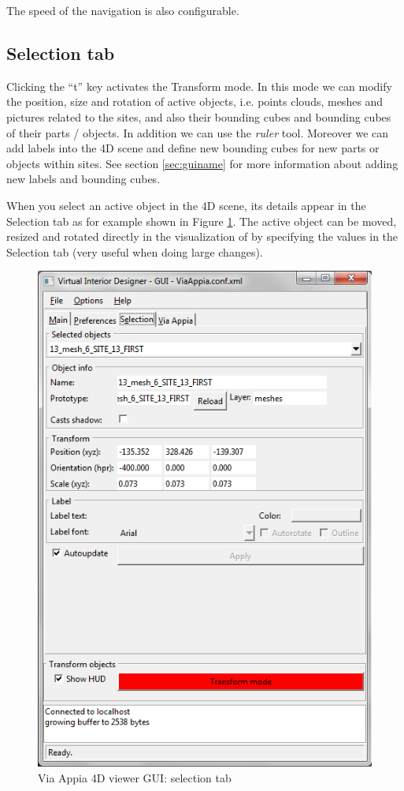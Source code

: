 \documentclass[a4paper,11pt]{article}
\begin{document}
The speed of the navigation is also configurable.

\subsection{Selection tab}

Clicking the ``t'' key activates the Transform mode. In this mode we can modify the position, size and rotation of active objects, i.e. points clouds, meshes and pictures related to the sites, and also their bounding cubes and bounding cubes of their parts / objects. In addition we can use the \textit{ruler} tool. Moreover we can add labels into the 4D scene and define new bounding cubes for new parts or objects within sites. See section \ref{sec:guiname} for more information about adding new labels and bounding cubes.

When you select an active object in the 4D scene, its details appear in the Selection tab as for example shown in Figure \ref{fig-guisel}. The active object can be moved, resized and rotated directly in the visualization of by specifying the values in the Selection tab (very useful when doing large changes).

\begin{figure}[!ht]
\centering
\includegraphics[scale=0.5]{fig/selection}
\caption{Via Appia 4D viewer GUI: selection tab}
\label{fig-guisel}
\end{figure}
\end{document}
